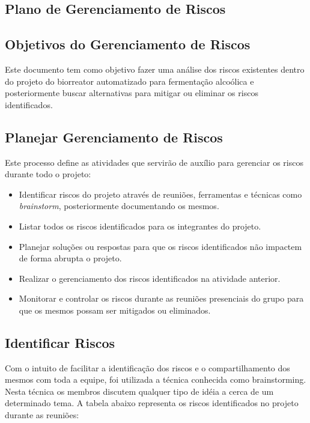 \begin{anexosenv}

\partanexos

\chapter{Plano de Gerenciamento de Riscos}

\section{Objetivos do Gerenciamento de Riscos}

Este documento tem como objetivo fazer uma análise dos riscos existentes dentro do projeto do biorreator automatizado para fermentação alcoólica e posteriormente buscar alternativas para mitigar ou eliminar os riscos identificados.

\section{Planejar Gerenciamento de Riscos}

Este processo define as atividades que servirão de auxílio para gerenciar os riscos durante todo o projeto:

\begin{itemize}
\item Identificar riscos do projeto através de reuniões, ferramentas e técnicas como \textit{brainstorm},  posteriormente documentando os mesmos.
\item Listar todos os riscos identificados para os integrantes do projeto.
\item Planejar soluções ou respostas para que os riscos identificados não impactem de forma abrupta o projeto.
\item Realizar o gerenciamento dos riscos identificados na atividade anterior.
\item Monitorar e controlar os riscos durante as reuniões presenciais do grupo para que os mesmos possam ser mitigados ou eliminados.
\end{itemize}

\section{Identificar Riscos}

Com o intuito de facilitar a identificação dos riscos e o compartilhamento dos mesmos com toda a equipe, foi utilizada a técnica conhecida como brainstorming. Nesta técnica os membros discutem qualquer tipo de idéia a cerca de um determinado tema. A tabela abaixo representa os riscos identificados no projeto durante as reuniões:




\end{anexosenv}
